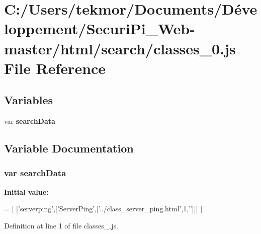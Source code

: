 \section{C\+:/\+Users/tekmor/\+Documents/\+Développement/\+Securi\+Pi\+\_\+\+Web-\/master/html/search/classes\+\_\+0.js File Reference}
\label{classes__0_8js}
\subsection*{Variables}
\begin{DoxyCompactItemize}
\item 
var {\bf search\+Data}
\end{DoxyCompactItemize}


\subsection{Variable Documentation}
\subsubsection[{search\+Data}]{\setlength{\rightskip}{0pt plus 5cm}var search\+Data}\label{classes__0_8js_ad01a7523f103d6242ef9b0451861231e}
{\bfseries Initial value\+:}
\begin{DoxyCode}
=
[
  [\textcolor{stringliteral}{'serverping'},[\textcolor{stringliteral}{'ServerPing'},[\textcolor{stringliteral}{'../class\_server\_ping.html'},1,\textcolor{stringliteral}{''}]]]
]
\end{DoxyCode}


Definition at line 1 of file classes\+\_.\+js.

